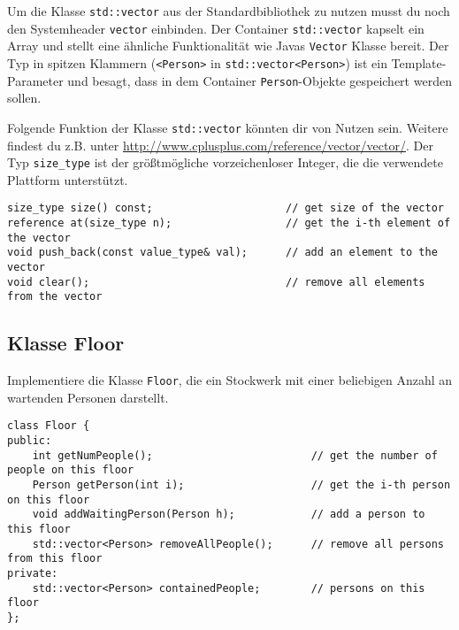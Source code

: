 Um die Klasse \lstinline{std::vector} aus der Standardbibliothek zu nutzen musst du noch den Systemheader \lstinline{vector} einbinden.
Der Container \lstinline{std::vector} kapselt ein Array und stellt eine ähnliche Funktionalität wie Javas \lstinline{Vector} Klasse bereit.
Der Typ in spitzen Klammern (\lstinline{<Person>} in \lstinline{std::vector<Person>}) ist ein Template-Parameter und besagt, dass in dem Container \lstinline{Person}-Objekte gespeichert werden sollen.

Folgende Funktion der Klasse \lstinline{std::vector} könnten dir von Nutzen sein. Weitere findest du z.B. unter \url{http://www.cplusplus.com/reference/vector/vector/}. Der Typ \lstinline{size_type} ist der größtmögliche vorzeichenloser Integer, die die verwendete Plattform unterstützt.

\begin{lstlisting}
size_type size() const;                     // get size of the vector
reference at(size_type n);                  // get the i-th element of the vector
void push_back(const value_type& val);      // add an element to the vector
void clear();                               // remove all elements from the vector
\end{lstlisting}


\subsection{Klasse Floor}
Implementiere die Klasse \lstinline{Floor}, die ein Stockwerk mit einer beliebigen Anzahl an wartenden Personen darstellt.

\begin{lstlisting}
class Floor {
public:
    int getNumPeople();                         // get the number of people on this floor
    Person getPerson(int i);                    // get the i-th person on this floor
    void addWaitingPerson(Person h);            // add a person to this floor
    std::vector<Person> removeAllPeople();      // remove all persons from this floor
private:
    std::vector<Person> containedPeople;        // persons on this floor
};
\end{lstlisting}

